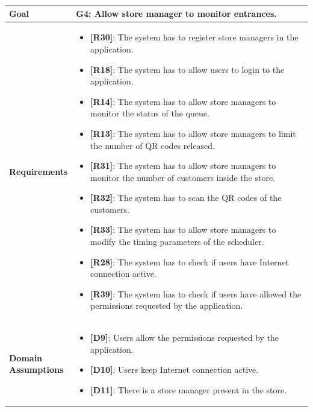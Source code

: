 \begin{table}[H]
\centering
\begin{tabular}{| m{} | m{} |} 
	\hline
	\textbf{Goal} &
		\textbf{G4: Allow store manager to monitor entrances.} \\
	\hline
	\textbf{Requirements} &
		\begin{itemize}
			\item {\textbf{[R30]}}: The system has to register store managers in the application.
			\item {\textbf{[R18]}}: The system has to allow users to login to the application.
			\item {\textbf{[R14]}}: The system has to allow store managers to monitor the status of the queue.
			\item {\textbf{[R13]}}: The system has to allow store managers to limit the number of QR codes released.
			\item {\textbf{[R31]}}: The system has to allow store managers to monitor the number of customers inside the store.
			\item {\textbf{[R32]}}: The system has to scan the QR codes of the customers.
			\item {\textbf{[R33]}}: The system has to allow store managers to modify the timing parameters of the scheduler.
			\item {\textbf{[R28]}}: The system has to check if users have Internet connection active.
			\item {\textbf{[R39]}}: The system has to check if users have allowed the permissions requested by the application.
		\end{itemize} \\ 
	\hline
	\shortstack[l]{\textbf{Domain} \\ \textbf{Assumptions}} & 
		\begin{itemize}
			\item {\textbf{[D9]}}: Users allow the permissions requested by the application.
			\item {\textbf{[D10]}}: Users keep Internet connection active.
			\item {\textbf{[D11]}}: There is a store manager present in the store.
		\end{itemize} \\ 
	\hline
\end{tabular}
\end{table}


